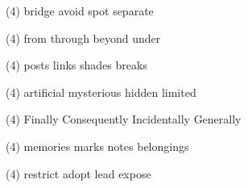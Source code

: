 \item
\begin{tasks}(4)
	\task bridge
	\task avoid
	\task spot
	\task separate
\end{tasks}
\item
\begin{tasks}(4)
	\task from
	\task through
	\task beyond
	\task under
\end{tasks}
\item
\begin{tasks}(4)
	\task posts
	\task links
	\task shades
	\task breaks
\end{tasks}
\item
\begin{tasks}(4)
	\task artificial
	\task mysterious
	\task hidden
	\task limited
\end{tasks}
\item
\begin{tasks}(4)
	\task Finally
	\task Consequently
	\task Incidentally
	\task Generally
\end{tasks}
\item
\begin{tasks}(4)
	\task memories
	\task marks
	\task notes
	\task belongings
\end{tasks}
\item
\begin{tasks}(4)
	\task restrict
	\task adopt
	\task lead
	\task expose
\end{tasks}